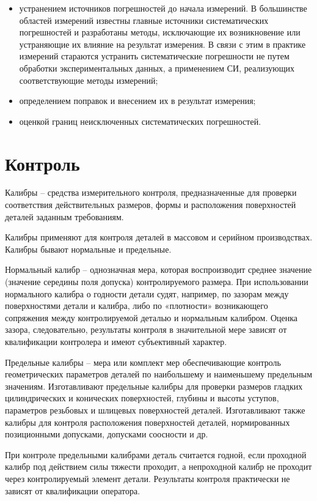 \begin{itemize}
	\item устранением источников погрешностей до начала измерений. В большинстве областей измерений известны главные источники систематических погрешностей и разработаны методы, исключающие их возникновение или устраняющие их влияние на результат измерения. В связи с этим в практике измерений стараются устранить систематические погрешности не путем обработки экспериментальных данных, а применением СИ, реализующих соответствующие методы измерений;
	
	\item определением поправок и внесением их в результат измерения;
	
	\item оценкой границ неисключенных систематических погрешностей.
\end{itemize}

\section{Контроль}

Калибры – средства измерительного контроля, предназначенные для проверки соответствия действительных размеров, формы и расположения поверхностей деталей заданным требованиям.

Калибры применяют для контроля деталей в массовом и серийном производствах. Калибры бывают нормальные и предельные.

Нормальный калибр – однозначная мера, которая воспроизводит среднее значение (значение середины поля допуска) контролируемого размера. При использовании нормального калибра о годности детали судят, например, по зазорам между поверхностями детали и калибра, либо по «плотности» возникающего сопряжения между контролируемой деталью и нормальным калибром. Оценка зазора, следовательно, результаты контроля в значительной мере зависят от квалификации контролера и имеют субъективный характер.

Предельные калибры – мера или комплект мер обеспечивающие контроль геометрических параметров деталей по наибольшему и наименьшему предельным значениям. Изготавливают предельные калибры для проверки размеров гладких цилиндрических и конических поверхностей, глубины и высоты уступов, параметров резьбовых и шлицевых поверхностей деталей. Изготавливают также калибры для контроля расположения поверхностей деталей, нормированных позиционными допусками, допусками соосности и др.

При контроле предельными калибрами деталь считается годной, если проходной калибр под действием силы тяжести проходит, а непроходной калибр не проходит через контролируемый элемент детали. Результаты контроля практически не зависят от квалификации оператора.

